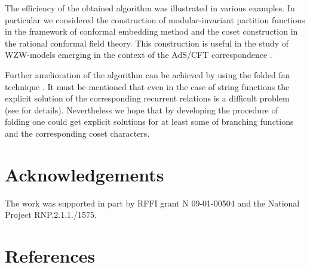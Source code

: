 \documentclass[12pt]{iopart}
\theoremstyle{definition}
\begin{document}
The efficiency of the obtained algorithm was illustrated in various examples.
In particular we considered the construction of modular-invariant partition functions
in the framework of conformal embedding method and the coset construction in the rational conformal field theory.
This construction is useful in the study of WZW-models
emerging in the context of the AdS/CFT correspondence \cite{Maldacena:2000hw,Maldacena:2000kv,Maldacena:2001km}.

Further amelioration of the algorithm can be achieved by using
the folded fan technique \cite{il2010folded}. It must be mentioned that even in the case
of string functions the explicit solution of the corresponding recurrent relations is
a difficult problem (see \cite{il2010folded} for details). Nevertheless we hope that by
developing the procedure of folding one could get explicit solutions
for at least some of branching functions and the corresponding coset characters.

\section{Acknowledgements}
The work was supported in
part by RFFI grant N 09-01-00504 and the National Project RNP.2.1.1./1575.

\section*{References}
{}

\end{document}
